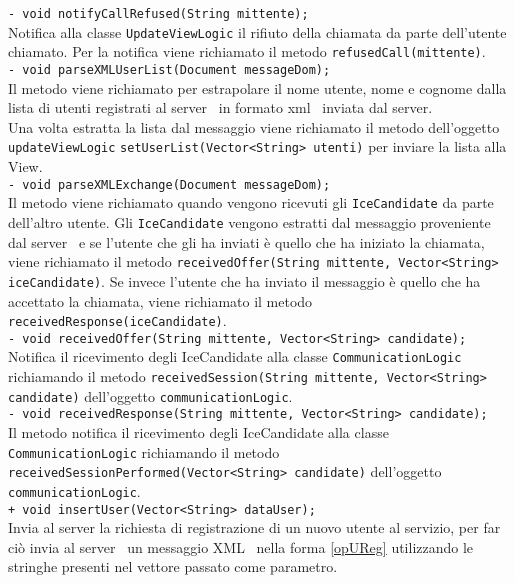 {{\begin{sloppypar}
{{\begin{itemize}
{					\texttt{- void notifyCallRefused(String mittente);}\\
					Notifica alla classe \texttt{UpdateViewLogic} il rifiuto della chiamata da parte dell'utente chiamato. Per la notifica viene richiamato il metodo \texttt{refusedCall(mittente)}.\\

					\texttt{- void parseXMLUserList(Document messageDom);}\\
					Il metodo viene richiamato per estrapolare il nome utente, nome e cognome dalla lista di utenti registrati al server\g~ in formato xml\g~ inviata dal server\g.\\
					Una volta estratta la lista dal messaggio viene richiamato il metodo dell'oggetto \texttt{updateViewLogic} \texttt{setUserList(Vector<String> utenti)} per inviare la lista alla View.\\

					\texttt{- void parseXMLExchange(Document messageDom);}\\
					Il metodo viene richiamato quando vengono ricevuti gli \texttt{IceCandidate} da parte dell'altro utente. Gli \texttt{IceCandidate} vengono estratti dal messaggio proveniente dal server\g~ e se l'utente che gli ha inviati è quello che ha iniziato la chiamata, viene richiamato il metodo \texttt{receivedOffer(String mittente, Vector<String> iceCandidate)}. Se invece l'utente che ha inviato il messaggio è quello che ha accettato la chiamata, viene richiamato il metodo \texttt{receivedResponse(iceCandidate)}.\\

					\texttt{- void receivedOffer(String mittente, Vector<String> candidate);}\\
					Notifica il ricevimento degli IceCandidate alla classe \texttt{CommunicationLogic} richiamando il metodo \texttt{receivedSession(String mittente, Vector<String> candidate)} dell'oggetto \texttt{communicationLogic}.\\

					\texttt{- void receivedResponse(String mittente, Vector<String> candidate);}\\
					Il metodo notifica il ricevimento degli IceCandidate alla classe \texttt{CommunicationLogic} richiamando il metodo \texttt{receivedSessionPerformed(Vector<String> candidate)} dell'oggetto \texttt{communicationLogic}.\\
					
					\texttt{+ void insertUser(Vector<String> dataUser);}\\
					Invia al server la richiesta di registrazione di un nuovo utente al servizio, per far ciò invia al server\g~ un messaggio XML\g~ nella forma \ref{opUReg} utilizzando le stringhe presenti nel vettore passato come parametro.\\
					
}
\end{itemize}}}
\end{sloppypar}}}
